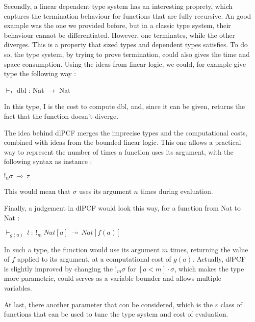 \documentclass[a4paper,12pt]{report}
\begin{document}
\medskip

Secondly, a linear dependent type system has an interesting proprety, which
captures the termination behaviour for functions that are fully recursive. An
good example was the one we provided before, but in a classic type system, their
behaviour cannot be differentiated. However, one terminates, while the other
diverges. This is a property that sized types and dependent types satisfies. To
do so, the type system, by trying to prove termination, could also gives the
time and space consumption. Using the ideas from linear logic, we could, for
example give type the following way :

\begin{center}
$\vdash_{I}$ dbl : Nat $\rightarrow$ Nat
\end{center}

In this type, I is the cost to compute dbl, and, since it can be given, returns
the fact that the function doesn't diverge.

The idea behind dlPCF merges the imprecise types and the computational costs,
combined with ideas from the bounded linear logic. This one allows a practical
way to represent the number of times a function uses its argument, with the
following syntax as instance :

\begin{center}
$!_{n}\sigma~\multimap~\tau$
\end{center} 

This would mean that $\sigma$ uses its argument $n$ times during evaluation. 

\medskip

Finally, a judgement in dlPCF would look this way, for a function from Nat to
Nat :

\begin{center}
$\vdash_{g(a)}~t~:~!_{m}~Nat[a]~\multimap~Nat[f(a)]$ 
\end{center}

In such a type, the function would use its argument $m$ times, returning 
the value of $f$ applied to its argument, at a computational cost of
$g(a)$. Actually, d$l$PCF is slightly improved by changing the $!_{m}\sigma$ for
$[a < m] \cdot \sigma$, which makes the type more parametric, could serves as a
variable bounder and allows multiple variables.

At last, there another parameter that con be considered, which is the $\varepsilon$
class of functions that can be used to tune the type system and cost of
evaluation.
\end{document}
